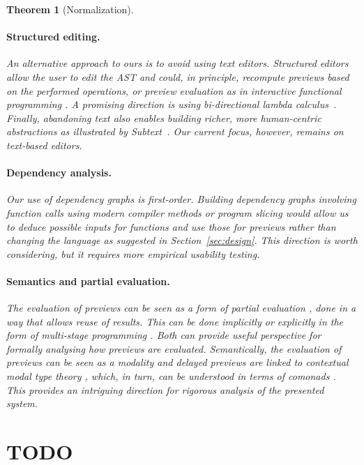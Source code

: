 \documentclass[acmsmall,anonymous,fleqn]{acmart}\settopmatter{printfolios=false,printccs=false,printacmref=false}
\newcounter{thc}
\theoremstyle{plain}
\newtheorem{theorem}[thc]{Theorem}
\theoremstyle{definition}
\begin{document}
\begin{theorem}[Normalization]
\paragraph{Structured editing.}
An alternative approach to ours is to avoid using text editors. Structured editors
\cite{structure-based} allow the user to edit the AST and could, in principle, recompute previews
based on the performed operations, or preview evaluation as in interactive functional programming
\cite{interactive}. A promising direction is using bi-directional lambda calculus~\cite{hazelnut}.
Finally, abandoning text also enables building richer, more human-centric
abstractions as illustrated by Subtext~\cite{subtext}. Our current focus, however, remains
on text-based editors.

\paragraph{Dependency analysis.}
Our use of dependency graphs \cite{dependencies} is first-order. Building dependency graphs
involving function calls using modern compiler methods \cite{optimizing} or program slicing
\cite{slicing} would allow us to deduce possible inputs for functions and use those for
previews rather than changing the language as suggested in Section~\ref{sec:design}. This direction
is worth considering, but it requires more empirical usability testing.

\paragraph{Semantics and partial evaluation.}
The evaluation of previews can be seen as a form of partial evaluation \cite{partial}, done in a
way that allows reuse of results. This can be done implicitly or explicitly in the form of
multi-stage programming \cite{metaml}. Both can provide useful perspective for formally analysing
how previews are evaluated. Semantically, the evaluation of previews can be seen as a modality
\cite{modal} and delayed previews are linked to contextual modal type theory \cite{cmtt}, which,
in turn, can be understood in terms of comonads \cite{cmtt-denotation}. This provides an intriguing
direction for rigorous analysis of the presented system.


\section{TODO}


\end{theorem}
\end{document}

